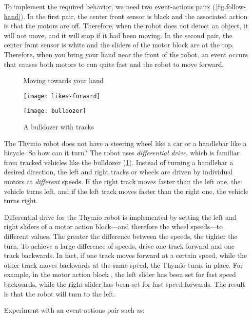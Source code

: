 To implement the required behavior, we need two event-actions pairs
(\cref{fig.follow-hand}). In the first pair, the center front sensor is
black and the associated action is that the motors are off. Therefore,
when the robot does not detect an object, it will not move, and it will
stop if it had been moving. In the second pair, the center front sensor
is white and the sliders of the motor block are at the top. Therefore,
when you bring your hand near the front of the robot, an event occurs
that causes both motors to run quite fast and the robot to move forward.

\begin{figure}
\begin{floatrow}
	\ffigbox
	{\caption{Moving towards your hand}\label{fig.follow-hand}}
	{\texttt{[image: likes-forward]}}
	\ffigbox
	{\caption{A bulldozer with tracks}\label{fig.bull}}
	{\texttt{[image: bulldozer]}}
\end{floatrow}
\end{figure}


The Thymio robot does not have a steering wheel like a car or a
handlebar like a bicycle. So how can it turn? The robot uses
\emph{differential drive}, which is familiar from tracked vehicles like
the bulldozer (\cref{fig.bull}). Instead of turning a handlebar a
desired direction, the left and right tracks or wheels are driven by
individual motors at \emph{different} speeds. If the right track moves
faster than the left one, the vehicle turns left, and if the left track
moves faster than the right one, the vehicle turns right.

Differential drive for the Thymio robot is implemented by setting the
left and right sliders of a motor action block---and therefore the wheel
speeds---to different values. The greater the difference between the
speeds, the tighter the turn. To achieve a large difference of speeds,
drive one track forward and one track backwards. In fact, if one
track moves forward at a certain speed, while the other track moves
backwards at the same speed, the Thymio turns in place. For example, in
the motor action block , the left slider has been
set for fast speed backwards, while the right slider has been set for
fast speed forwards. The result is that the robot will turn to the left.

\newpage

Experiment with an event-actions pair such as: 

